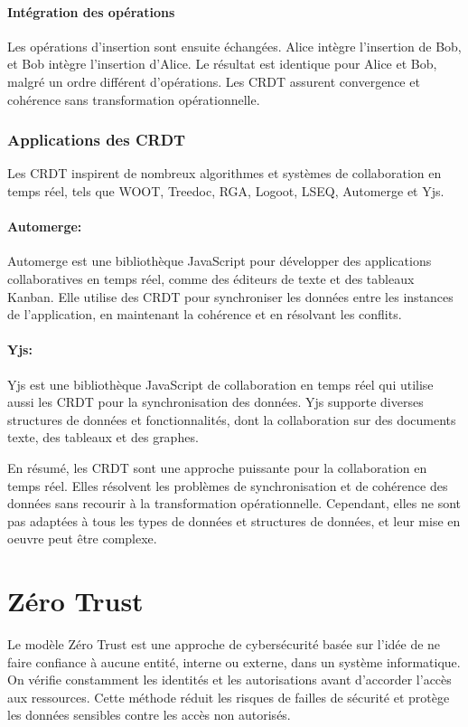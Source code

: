 \paragraph{Intégration des opérations}
Les opérations d'insertion sont ensuite échangées. Alice intègre l'insertion de Bob, et Bob intègre l'insertion d'Alice. Le résultat est identique pour Alice et Bob, malgré un ordre différent d'opérations. Les CRDT assurent convergence et cohérence sans transformation opérationnelle.

\subsubsection{Applications des \Gls{CRDT}}
Les \Gls{CRDT} inspirent de nombreux algorithmes et systèmes de collaboration en temps réel, tels que WOOT, Treedoc, RGA, Logoot, LSEQ, Automerge et Yjs.

\paragraph{Automerge\cite{hardenbergAutomerge2023}: } Automerge est une bibliothèque JavaScript pour développer des applications collaboratives en temps réel, comme des éditeurs de texte et des tableaux Kanban. Elle utilise des \Gls{CRDT} pour synchroniser les données entre les instances de l'application, en maintenant la cohérence et en résolvant les conflits.

\paragraph{Yjs\cite{nicolaescuYjsFrameworkRealTime2015}: } Yjs est une bibliothèque JavaScript de collaboration en temps réel qui utilise aussi les \Gls{CRDT} pour la synchronisation des données. Yjs supporte diverses structures de données et fonctionnalités, dont la collaboration sur des documents texte, des tableaux et des graphes.

En résumé, les \Gls{CRDT} sont une approche puissante pour la collaboration en temps réel. Elles résolvent les problèmes de synchronisation et de cohérence des données sans recourir à la transformation opérationnelle. Cependant, elles ne sont pas adaptées à tous les types de données et structures de données, et leur mise en oeuvre peut être complexe.

\section{Zéro Trust}
Le modèle Zéro Trust est une approche de cybersécurité basée sur l'idée de ne faire confiance à aucune entité, interne ou externe, dans un système informatique. On vérifie constamment les identités et les autorisations avant d'accorder l'accès aux ressources. Cette méthode réduit les risques de failles de sécurité et protège les données sensibles contre les accès non autorisés.

